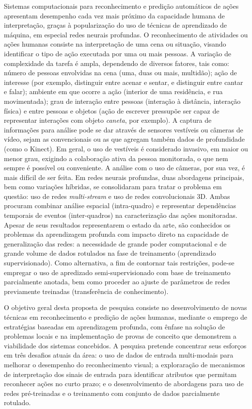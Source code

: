 Sistemas computacionais para reconhecimento e predição automáticos de ações apresentam desempenho cada vez mais próximo da capacidade humana de interpretação, graças à popularização do uso de técnicas de aprendizado de máquina, em especial redes neurais profundas. 
%
O reconhecimento de atividades ou ações humanas consiste na interpretação de uma cena ou situação, visando identificar o tipo de ação executada por uma ou mais pessoas. 
%
A variação de complexidade da tarefa é ampla, dependendo de diversos fatores, tais como: número de pessoas envolvidas na cena (uma, duas ou mais, multidão); ação de interesse (por exemplo, distinguir entre acenar e sentar, e distinguir entre cantar e falar); ambiente em que ocorre a ação (interior de uma residência, e rua movimentada); grau de interação entre pessoas (interação à distância, interação física) e entre pessoas e objetos (ação de escrever pressupõe ser capaz de representar interações com objeto \emph{caneta}, por exemplo). 
%
A captura de informações para análise pode se dar através de sensores vestíveis ou câmeras de vídeo, sejam as convencionais ou as que agregam também dados de profundidade (como o Kinect). Em geral, o uso de vestíveis é considerado invasivo, em maior ou menor grau, exigindo a colaboração ativa da pessoa monitorada, o que nem sempre é possível ou conveniente. A análise com o uso de câmeras, por sua vez, é mais difícil de ser feita. 
%
Em redes neurais profundas, duas abordagens principais, bem como variações híbridas, se consolidaram para tratar o problema em questão: uso de redes \emph{multi-stream} e uso de redes convolucionais 3D. Ambas procuram combinar análise espacial (intra-quadro) e representar dependências temporais de eventos (inter-quadros) na caracterização das ações monitoradas. 
%
Apesar de seus resultados representarem o estado da arte, são conhecidos os problemas da aprendizagem profunda com impacto direto na capacidade de generalização das redes: a necessidade de grande poder computacional e de grande volume de dados rotulados na fase de treinamento (aprendizado supervisionado). Como alternativa, a fim de contornar tais restrições, pode-se empregar o uso de apredizado semi-supervisionado com base de treinamento parcialmente anotada, bem como proceder ao ajuste de parâmetros de redes previamente treinadas (transferência de conhecimento).


O objetivo geral desta proposta de pesquisa consiste no desenvolvimento de novas técnicas em reconhecimento e predição de ações humanas, mediante o emprego de estratégias baseadas em aprendizagem profunda, com ênfase na solução de problemas locais e na implementação de provas de conceito que demonstrem a viabilidade dos sistemas concebidos. A pesquisa pretende concentrar seus esforços em três desafios atuais da área: o uso de dados de entrada multi-modais para melhorar o desempenho do reconhecimento visual; a exploraração de mecanismos de interpretação dos sinais de entrada para identificar atributos que permitam reconhecer ações no curto prazo; e o desenvolvimento de abordagens para uso de redes pré-treinadas e o treinamento com conjunto de dados parcialmente rotulado.

